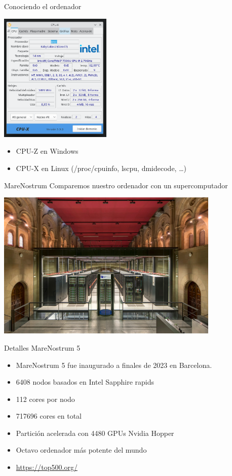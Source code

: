 \documentclass[bigger]{beamer}
\begin{document}
\begin{frame}[label={sec:org1021a44}]{Conociendo el ordenador}
\begin{center}
\includegraphics[width=0.4\textwidth]{./CPUX.png}
\end{center}

\begin{itemize}
\item CPU-Z en Windows
\item CPU-X en Linux (/proc/cpuinfo, lscpu, dmidecode, \ldots{})
\end{itemize}
\end{frame}

\begin{frame}[label={sec:org9b85ab9}]{MareNostrum}
Comparemos nuestro ordenador con un supercomputador

\begin{center}
\includegraphics[width=0.8\textwidth]{./MareNostrum.jpg}
\end{center}
\end{frame}

\begin{frame}[label={sec:orgcd55cb0}]{Detalles MareNostrum 5}
\begin{itemize}
\item MareNostrum 5 fue inaugurado a finales de 2023 en Barcelona.
\item 6408 nodos basados en Intel Sapphire rapids
\item 112 cores por nodo
\item 717696 cores en total
\item Partición acelerada con 4480 GPUs Nvidia Hopper
\item Octavo ordenador más potente del mundo
\item \url{https://top500.org/}
\end{itemize}
\end{frame}
\end{document}
